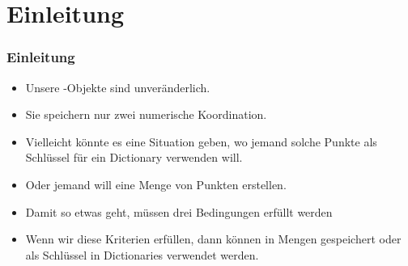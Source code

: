 \documentclass[aspectratio=169,mathserif,notheorems]{beamer}%
\subtitle{45.~Klassen/Dunder:~\texttt{\_\_hash\_\_}}%
\begin{document}
%
%
\startPresentation%
%
\section{Einleitung}%
\begin{frame}[t]%
\frametitle{Einleitung}%
\begin{itemize}%
%
\item Unsere -Objekte sind unveränderlich.%
%
\item<2-> Sie speichern nur zwei numerische Koordination.%
%
\item<3-> Vielleicht könnte es eine Situation geben, wo jemand solche Punkte als Schlüssel für ein Dictionary verwenden will.%
%
\item<4-> Oder jemand will eine Menge von Punkten erstellen.%
%
\item<5-> Damit so etwas geht, müssen drei Bedingungen erfüllt werden%
%
\item<12-> Wenn wir diese Kriterien erfüllen, dann können  in Mengen gespeichert oder als Schlüssel in Dictionaries verwendet werden.%
%
\end{itemize}%
\end{frame}%
%
%
\end{document}
